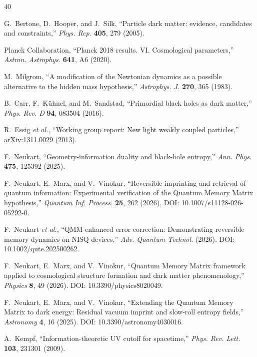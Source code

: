 ﻿\documentclass[12pt,a4paper]{article}
\begin{document}
\begin{thebibliography}{40}

G.~Bertone, D.~Hooper, and J.~Silk,
``Particle dark matter: evidence, candidates and constraints,''
\textit{Phys. Rep.} \textbf{405}, 279 (2005).

Planck Collaboration,
``Planck 2018 results. VI. Cosmological parameters,''
\textit{Astron. Astrophys.} \textbf{641}, A6 (2020).

M.~Milgrom,
``A modification of the Newtonian dynamics as a possible alternative to the hidden mass hypothesis,''
\textit{Astrophys. J.} \textbf{270}, 365 (1983).

B.~Carr, F.~K\"uhnel, and M.~Sandstad,
``Primordial black holes as dark matter,''
\textit{Phys. Rev. D} \textbf{94}, 083504 (2016).

R.~Essig \textit{et al.},
``Working group report: New light weakly coupled particles,''
arXiv:1311.0029 (2013).

F.~Neukart,
``Geometry-information duality and black-hole entropy,''
\textit{Ann. Phys.} \textbf{475}, 125392 (2025).

F.~Neukart, E.~Marx, and V.~Vinokur,
``Reversible imprinting and retrieval of quantum information: Experimental verification of the Quantum Memory Matrix hypothesis,''
\textit{Quantum Inf. Process.} \textbf{25}, 262 (2026).
DOI: 10.1007/s11128-026-05292-0.

F.~Neukart \textit{et al.},
``QMM-enhanced error correction: Demonstrating reversible memory dynamics on NISQ devices,''
\textit{Adv. Quantum Technol.} (2026).
DOI: 10.1002/qute.202500262.

F.~Neukart, E.~Marx, and V.~Vinokur,
``Quantum Memory Matrix framework applied to cosmological structure formation and dark matter phenomenology,''
\textit{Physics} \textbf{8}, 49 (2026).
DOI: 10.3390/physics8020049.

F.~Neukart, E.~Marx, and V.~Vinokur,
``Extending the Quantum Memory Matrix to dark energy: Residual vacuum imprint and slow-roll entropy fields,''
\textit{Astronomy} \textbf{4}, 16 (2025).
DOI: 10.3390/astronomy4030016.

A.~Kempf,
``Information-theoretic UV cutoff for spacetime,''
\textit{Phys. Rev. Lett.} \textbf{103}, 231301 (2009).


\end{thebibliography}
\end{document}
